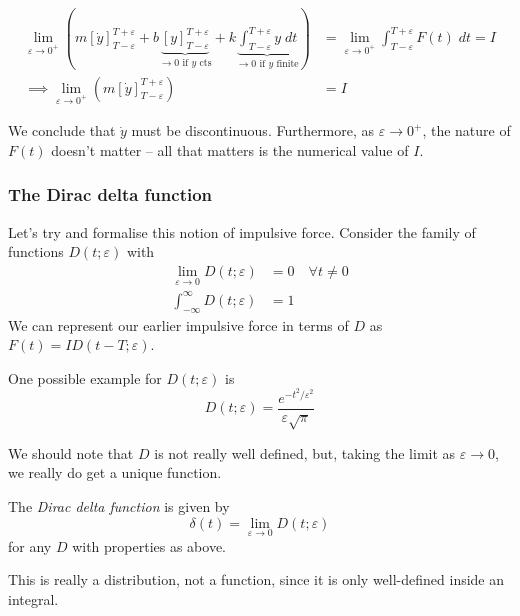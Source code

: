 \documentclass{../../template/note}
\begin{document}
    \begin{align*}
        \lim_{\varepsilon \to 0^+} \left(m \left[\dot y\right]_{T - \varepsilon}^{T + \varepsilon} + b\underbrace{\left[y\right]_{T - \varepsilon}^{T + \varepsilon}}_{\to 0 \text{ if } y \text{ cts}} + k \underbrace{\int_{T - \varepsilon}^{T + \varepsilon} y \; dt}_{\to 0 \text{ if } y \text{ finite}}\right) &= \lim_{\varepsilon \to 0^+} \int_{T - \varepsilon}^{T + \varepsilon} F(t) \; dt = I \\
        \implies \lim_{\varepsilon \to 0^+} \left(m \left[\dot y\right]_{T - \varepsilon}^{T + \varepsilon}\right) &= I
    \end{align*}
    
    We conclude that \(\dot y\) must be discontinuous. Furthermore, as \(\varepsilon \to 0^+\), the nature of \(F(t)\) doesn't matter -- all that matters is the numerical value of \(I\).
    
    \subsubsection{The Dirac delta function}

    Let's try and formalise this notion of impulsive force. Consider the family of functions \(D(t; \varepsilon)\) with
    \begin{align*}
        \lim_{\varepsilon \to 0} D(t; \varepsilon) &= 0 \quad \forall t \neq 0 \\
        \int_{-\infty}^\infty D(t; \varepsilon) &= 1 
    \end{align*}
    We can represent our earlier impulsive force in terms of \(D\) as \(F(t) = ID(t - T; \varepsilon)\).

    One possible example for \(D(t; \varepsilon)\) is
    \[
        D(t; \varepsilon) = \frac{e^{-t^2/\varepsilon^2}}{\varepsilon \sqrt{\pi}}
    \]
    
    We should note that \(D\) is not really well defined, but, taking the limit as \(\varepsilon \to 0\), we really do get a unique function.

    \begin{definition}
        The \emph{Dirac delta function} is given by
        \[
            \delta(t) = \lim_{\varepsilon \to 0}D(t; \varepsilon)
        \]
        for any \(D\) with properties as above.
    \end{definition}
    
    \begin{remark*}
        This is really a distribution, not a function, since it is only well-defined inside an integral.
    \end{remark*}
    
\end{document}
